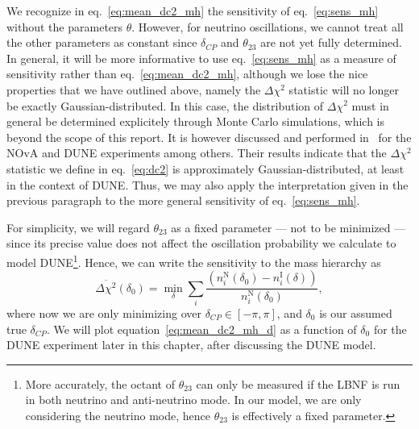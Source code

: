 We recognize in eq.~\ref{eq:mean_dc2_mh} the sensitivity of
eq.~\ref{eq:sens_mh} without the parameters $\theta$.  However, for neutrino
oscillations, we cannot treat all the other parameters as constant since
$\delta_{CP}$ and $\theta_{23}$ are not yet fully determined. In general, it
will be more informative to use eq.~\ref{eq:sens_mh} as a measure of
sensitivity rather than eq.~\ref{eq:mean_dc2_mh}, although we lose the nice
properties that we have outlined above, namely the $\Delta\chi^2$ statistic
will no longer be exactly Gaussian-distributed. In this case, the distribution
of $\Delta\chi^2$ must in general be determined explicitely through Monte Carlo
simulations, which is beyond the scope of this report. It is however discussed
and performed in~\cite{blennow} for the NOvA and DUNE experiments among others.
Their results indicate that the $\Delta\chi^2$ statistic we define in
eq.~\ref{eq:dc2} is approximately Gaussian-distributed, at least in the context
of DUNE. Thus, we may also apply the interpretation given in the previous
paragraph to the more general sensitivity of eq.~\ref{eq:sens_mh}.


For simplicity, we will regard $\theta_{23}$ as a fixed parameter --- not to
be minimized --- since its precise value
does not affect the oscillation probability we calculate to model
DUNE\footnote{More accurately, the octant of $\theta_{23}$ can only be measured
if the LBNF is run in both neutrino and anti-neutrino mode\cite{raut}. In our model, we
are only considering the neutrino mode, hence $\theta_{23}$ is effectively a
fixed parameter.}. Hence, we can write the sensitivity to the mass
hierarchy as
\begin{equation}
	\overline{\Delta\chi^2}(\delta_0) = \min_\delta \sum_i \frac{(n^\text{N}_i
	(\delta_0) - n^\text{I}_i
	(\delta))}{n^\text{N}_i(\delta_0)},\label{eq:mean_dc2_mh_d}
\end{equation}
where now we are only minimizing over $\delta_{CP} \in [-\pi,
\pi]$, and $\delta_0$ is our assumed true $\delta_{CP}$.
We will plot equation~\ref{eq:mean_dc2_mh_d} as a function of
$\delta_0$ for the DUNE experiment later in this chapter, after discussing the
DUNE model.



